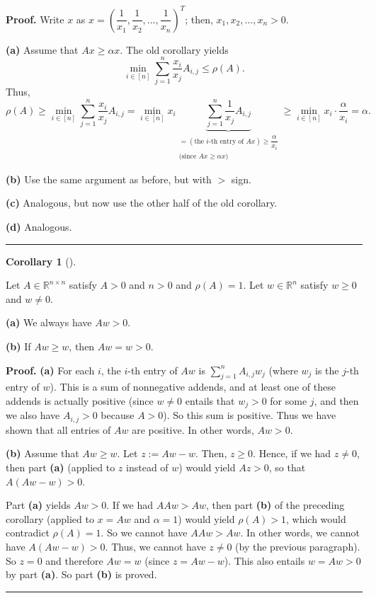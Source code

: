 \documentclass[numbers=enddot,12pt,final,onecolumn,notitlepage]{scrartcl}%
\numberwithin{exer}{subsection}
\theoremstyle{definition}
\newtheorem{coro}[theo]{Corollary}
\newenvironment{corollary}[1][]
{\begin{coro}[#1]\begin{leftbar}}
{\end{leftbar}\end{coro}}
\newenvironment{proof}[1][Proof]{\noindent\textbf{#1.} }{\ \rule{0.5em}{0.5em}}
\let\sumnonlimits\sum
\renewcommand{\sum}{\sumnonlimits\limits}
\begin{document}
\begin{proof}
Write $x$ as $x=\left(  \dfrac{1}{x_{1}},\dfrac{1}{x_{2}},\ldots,\dfrac
{1}{x_{n}}\right)  ^{T}$; then, $x_{1},x_{2},\ldots,x_{n}>0$.

\textbf{(a)} Assume that $Ax\geq\alpha x$. The old corollary yields
\[
\min\limits_{i\in\left[  n\right]  }\sum_{j=1}^{n}\dfrac{x_{i}}{x_{j}}%
A_{i,j}\leq\rho\left(  A\right)  .
\]
Thus,%
\[
\rho\left(  A\right)  \geq\min\limits_{i\in\left[  n\right]  }\sum_{j=1}%
^{n}\dfrac{x_{i}}{x_{j}}A_{i,j}=\min\limits_{i\in\left[  n\right]  }%
x_{i}\underbrace{\sum_{j=1}^{n}\dfrac{1}{x_{j}}A_{i,j}}_{\substack{=\left(
\text{the }i\text{-th entry of }Ax\right)  \geq\dfrac{\alpha}{x_{i}%
}\\\text{(since }Ax\geq\alpha x\text{)}}}\geq\min\limits_{i\in\left[
n\right]  }x_{i}\cdot\dfrac{\alpha}{x_{i}}=\alpha.
\]


\textbf{(b)} Use the same argument as before, but with $>$ sign.

\textbf{(c)} Analogous, but now use the other half of the old corollary.

\textbf{(d)} Analogous.
\end{proof}

\begin{corollary}
Let $A\in\mathbb{R}^{n\times n}$ satisfy $A>0$ and $n>0$ and $\rho\left(
A\right)  =1$. Let $w\in\mathbb{R}^{n}$ satisfy $w\geq0$ and $w\neq0$.

\textbf{(a)} We always have $Aw>0$.

\textbf{(b)} If $Aw\geq w$, then $Aw=w>0$.
\end{corollary}

\begin{proof}
\textbf{(a)} For each $i$, the $i$-th entry of $Aw$ is $\sum_{j=1}^{n}%
A_{i,j}w_{j}$ (where $w_{j}$ is the $j$-th entry of $w$). This is a sum of
nonnegative addends, and at least one of these addends is actually positive
(since $w\neq0$ entails that $w_{j}>0$ for some $j$, and then we also have
$A_{i,j}>0$ because $A>0$). So this sum is positive. Thus we have shown that
all entries of $Aw$ are positive. In other words, $Aw>0$.

\textbf{(b)} Assume that $Aw\geq w$. Let $z:=Aw-w$. Then, $z\geq0$. Hence, if
we had $z\neq0$, then part \textbf{(a)} (applied to $z$ instead of $w$) would
yield $Az>0$, so that $A\left(  Aw-w\right)  >0$.

Part \textbf{(a)} yields $Aw>0$. If we had $AAw>Aw$, then part \textbf{(b)} of
the preceding corollary (applied to $x=Aw$ and $\alpha=1$) would yield
$\rho\left(  A\right)  >1$, which would contradict $\rho\left(  A\right)  =1$.
So we cannot have $AAw>Aw$. In other words, we cannot have $A\left(
Aw-w\right)  >0$. Thus, we cannot have $z\neq0$ (by the previous paragraph).
So $z=0$ and therefore $Aw=w$ (since $z=Aw-w$). This also entails $w=Aw>0$ by
part \textbf{(a)}. So part \textbf{(b)} is proved.
\end{proof}
\end{document}
